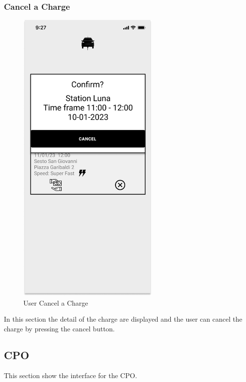 \subsubsection{Cancel a Charge}
\begin{figure}[H]
    \centering
    \includegraphics[keepaspectratio, height=15cm]{AppInterface/Delete Charge.png}
    \caption{User Cancel a Charge}
    \label{pop:Delete}
\end{figure}
In this section the detail of the charge are displayed and the user can cancel the charge by pressing the cancel button.
\subsection{CPO}
This section show the interface for the \ac{CPO}.
